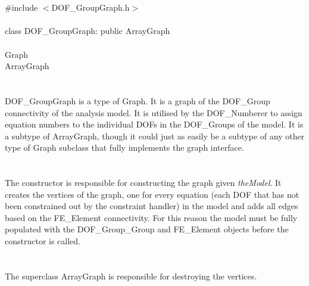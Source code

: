 
 \\

   \\
\indent \#include $<$DOF\_GroupGraph.h$>$  \\

  \\
\indent class DOF\_GroupGraph: public ArrayGraph \\

 \\
\indent Graph \\
\indent\indent ArrayGraph \\
\indent\indent{} \\

  \\
\indent DOF\_GroupGraph is a type of Graph. It is a graph of the DOF\_Group
connectivity of the analysis model. It is utilised by the
DOF\_Numberer to assign equation numbers to the individual DOFs in the
DOF\_Groups of the model. It is a subtype of
ArrayGraph, though it could just as easily be a subtype of any other
type of Graph subclass that fully implements the graph interface. \\ 

  \\
  \\
The constructor is responsible for constructing the graph given {\em
theModel}. It creates the vertices of the graph, one for every
equation  (each DOF that has not been constrained out by the
constraint handler)  in the model and adds all edges based on the FE\_Element
connectivity. For this reason the model must be fully populated with
the DOF\_Group\_Group and FE\_Element objects before the constructor is
called. \\

  \\
  \\
The superclass ArrayGraph is responsible for destroying the vertices. \\

  \\

  \\
